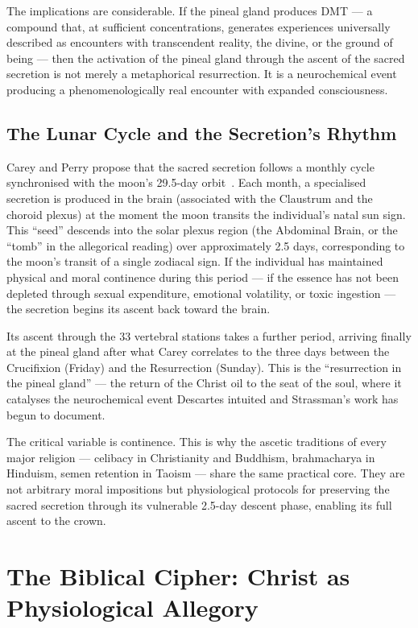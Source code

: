 \documentclass[12pt, a4paper]{article}
\begin{document}
The implications are considerable. If the pineal gland produces DMT — a
compound that, at sufficient concentrations, generates experiences universally
described as encounters with transcendent reality, the divine, or the ground
of being — then the activation of the pineal gland through the ascent of the
sacred secretion is not merely a metaphorical resurrection. It is a
neurochemical event producing a phenomenologically real encounter with
expanded consciousness.

\subsection{The Lunar Cycle and the Secretion's Rhythm}

Carey and Perry propose that the sacred secretion follows a monthly cycle
synchronised with the moon's 29.5-day orbit~\autocite[52]{carey1932}. Each
month, a specialised secretion is produced in the brain (associated with the
Claustrum and the choroid plexus) at the moment the moon transits the
individual's natal sun sign. This ``seed'' descends into the solar plexus
region (the Abdominal Brain, or the ``tomb'' in the allegorical reading) over
approximately 2.5 days, corresponding to the moon's transit of a single
zodiacal sign. If the individual has maintained physical and moral continence
during this period — if the essence has not been depleted through sexual
expenditure, emotional volatility, or toxic ingestion — the secretion begins
its ascent back toward the brain.

Its ascent through the 33 vertebral stations takes a further period, arriving
finally at the pineal gland after what Carey correlates to the three days
between the Crucifixion (Friday) and the Resurrection (Sunday). This is the
``resurrection in the pineal gland'' — the return of the Christ oil to the
seat of the soul, where it catalyses the neurochemical event Descartes
intuited and Strassman's work has begun to document.

The critical variable is continence. This is why the ascetic traditions of
every major religion — celibacy in Christianity and Buddhism, brahmacharya in
Hinduism, semen retention in Taoism — share the same practical core. They are
not arbitrary moral impositions but physiological protocols for preserving the
sacred secretion through its vulnerable 2.5-day descent phase, enabling its
full ascent to the crown.

\section{The Biblical Cipher: Christ as Physiological Allegory}
\label{sec:bible}
\end{document}
